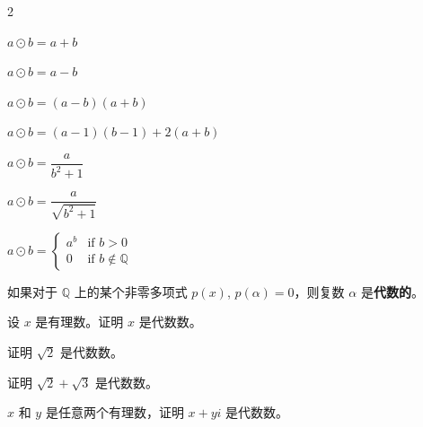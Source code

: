 \begin{multicols}{2}
\begin{chapex}
\label{cqClosureOfNumberSetsBegin}
$a \odot b = a + b$
\end{chapex}

\begin{chapex}
$a \odot b = a - b$
\end{chapex}

\begin{chapex}
$a \odot b = (a-b)(a+b)$
\end{chapex}

\begin{chapex}
$a \odot b = (a-1)(b-1) + 2(a+b)$
\end{chapex}

\begin{chapex}
$a \odot b = \dfrac{a}{b^2+1}$
\end{chapex}

\begin{chapex}
$a \odot b = \dfrac{a}{\sqrt{b^2+1}}$
\end{chapex}

\begin{chapex}
\label{cqClosureOfNumberSetsEnd}
$a \odot b = \begin{cases} a^{b} & \text{if $b > 0$} \\ 0 & \text{if $b \not\in \mathbb{Q}$} \end{cases}$
\end{chapex}
\end{multicols}

\begin{definition}
如果对于 $\mathbb{Q}$ 上的某个非零多项式 $p(x)$, $p(\alpha) = 0$，则复数 $\alpha$ 是\textbf{代数的}。
\end{definition}

\begin{chapex}
设 $x$ 是有理数。证明 $x$ 是代数数。
\end{chapex}

\begin{chapex}
证明 $\sqrt{2}$ 是代数数。
\end{chapex}

\begin{chapex}
证明 $\sqrt{2} + \sqrt{3}$ 是代数数。
\end{chapex}

\begin{chapex}
$x$ 和 $y$ 是任意两个有理数，证明 $x+yi$ 是代数数。
\end{chapex}

